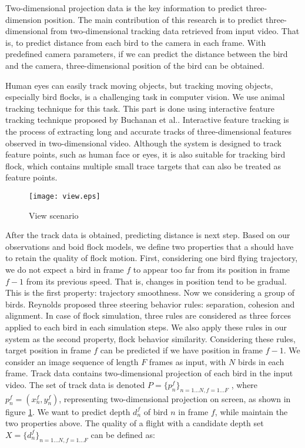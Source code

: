 Two-dimensional projection data is the key information to predict three-dimension position. The main contribution of this research is to predict three-dimensional from two-dimensional tracking data retrieved from input video. That is, to predict distance from each bird to the camera in each frame. With predefined camera parameters, if we can predict the distance between the bird and the camera, three-dimensional position of the bird can be obtained.


Human eyes can easily track moving objects, but tracking moving objects, especially bird flocks, is a challenging task in computer vision. We use animal tracking technique for this task. This part is done using interactive feature tracking technique proposed by Buchanan et al.\cite{Tracking}. Interactive feature tracking is the process of extracting long and accurate tracks of three-dimensional features observed in two-dimensional video. Although the system is designed to track feature points, such as human face or eyes, it is also suitable for tracking bird flock, which contains multiple small trace targets that can also be treated as feature points.


\begin{figure}[h]
 \begin{center}
  \texttt{[image: view.eps]}
 \end{center}
 \caption{View scenario}
 \label{figure:view}
\end{figure}


After the track data is obtained, predicting distance is next step. Based on our observations and boid flock models, we define two properties that a should have to retain the quality of flock motion. First, considering one bird flying trajectory, we do not expect a bird in frame $f$ to appear too far from its position in frame $f-1$ from its previous speed. That is, changes in position tend to be gradual. This is the first property: trajectory smoothness. Now we considering a group of birds. Reynolds proposed three steering behavior rules: separation, cohesion and alignment\cite{Boid}. In case of flock simulation, three rules are considered as three forces applied to each bird in each simulation steps. We also apply these rules in our system as the second property, flock behavior similarity. Considering these rules, target position in frame $f$ can be predicted if we have position in frame $f-1$. We consider an image sequence of length $F$ frames as input, with $N$ birds in each frame. Track data contains two-dimensional projection of each bird in the input video. The set of track data is denoted $P=\big\{p_n^f\big\}_{n=1...N,f=1...F}$ , where $p_n^f=(x_n^f, y_n^f)$, representing two-dimensional projection on screen, as shown in figure \ref{figure:view}. We want to predict depth $d_n^f$ of bird $n$ in frame $f$, while maintain the two properties above. The quality of a flight with a candidate depth set $X=\big\{d_n^f\big\}_{n=1...N,f=1...F}$ can be defined as:


